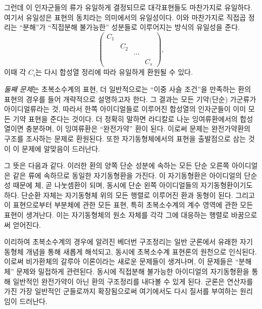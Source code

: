 그런데 이 인자군들의 류가 유일하게 결정되므로 대각표현들도 마찬가지로 유일하다. 여기서 유일성은 표현의 동치라는 의미에서의 유일성이다. 이와 마찬가지로 직접곱 정리는 ``분해''가 ``직접분해 불가능한'' 성분들로 이루어지는 방식의 유일성을 준다.
\[
\begin{pmatrix}
C_1&&&\\
&C_2&&\\
&&\cdots&\\
&&&C_s
\end{pmatrix},
\]
이때 각 $C_i$는 다시 합성열 정리에 따라 유일하게 환원될 수 있다.

\emph{둘째 문제}는 초복소수계의 표현, 더 일반적으로는 ``이중 사슬 조건''을 만족하는 환의 표현의 경우를 들어 개략적으로 설명하고자 한다. 그 결과는 모든 기약(단순) 가군류가 아이디얼류라는 것, 따라서 한쪽 아이디얼들로 이루어진 합성열의 인자군들이 이미 모든 기약 표현을 준다는 것이다. 더 정확히 말하면 라디칼로 나눈 잉여류환에서의 합성열이면 충분하며, 이 잉여류환은 ``완전가약'' 환이 된다. 이로써 문제는 완전가약환의 구조를 조사하는 문제로 환원된다. 또한 자기동형체에서의 표현을 출발점으로 삼는 것이 이 문제에 알맞음이 드러난다.

그 뜻은 다음과 같다. 이러한 환의 양쪽 단순 성분에 속하는 모든 단순 오른쪽 아이디얼은 같은 류에 속하므로 동일한 자기동형환을 가진다. 이 자기동형환은 아이디얼의 단순성 때문에 체, 곧 나눗셈환이 되며, 동시에 단순 왼쪽 아이디얼들의 자기동형환이기도 하다. 단순환 자체는 자기동형체 위의 모든 행렬로 이루어진 환과 동형이 된다. 그리고 이 표현으로부터 부분체에 관한 모든 표현, 특히 초복소수계의 계수 영역에 관한 모든 표현이 생겨난다. 이는 자기동형체의 원소 자체를 각각 그에 대응하는 행렬로 바꿈으로써 얻어진다.

이리하여 초복소수계의 경우에 알려진 베더번 구조정리는 일반 군론에서 유래한 자기동형체 개념을 통해 새롭게 해석되고, 동시에 초복소수계 표현론의 원천으로 인식된다. 이로써 비가환체의 갈루아 이론이라는 새로운 문제들이 생겨나며, 이 문제들은 ``분해체'' 문제와 밀접하게 관련된다. 동시에 직접분해 불가능한 아이디얼의 자기동형환을 통해 일반적인 완전가약이 아닌 환의 구조정리를 내다볼 수 있게 된다. 군론은 연산자를 가진 가장 일반적인 군들로까지 확장됨으로써 여기에서도 다시 질서를 부여하는 원리임이 드러난다.
